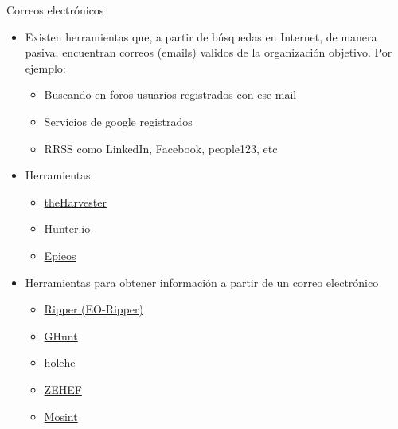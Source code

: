 \documentclass[aspectratio=169,11pt]{beamer}
\begin{document}
\begin{frame}[allowframebreaks]{Correos electrónicos}
\small
  \begin{itemize}
  \item Existen herramientas que, a partir de búsquedas en Internet, de manera pasiva, encuentran correos (emails) validos de la organización objetivo. Por ejemplo:
  \begin{itemize}

  \item Buscando en foros usuarios registrados con ese mail
  \item Servicios de google registrados
  \item RRSS como LinkedIn, Facebook, people123, etc

  \end{itemize}
  \item Herramientas:
  \begin{itemize}

  \item \href{https://github.com/laramies/theHarvester}{theHarvester}
  \item \href{https://hunter.io/}{Hunter.io}
  \item \href{https://epieos.com/}{Epieos}
    \end{itemize}
  \item Herramientas para obtener información a partir de un correo electrónico
    \begin{itemize}

  \item \href{https://github.com/Quantika14/email-osint-ripper}{Ripper (EO-Ripper)}
  \item \href{https://github.com/mxrch/GHunt}{GHunt}
  \item \href{https://github.com/megadose/holehe}{holehe}
  \item \href{https://www.linkedin.com/posts/vicentegarrigues-trenor_osint-cybersecurity-emailosint-ugcPost-7336529048434606080-MccL/}{ZEHEF}
  \item \href{https://www.linkedin.com/posts/carlos-bartels-66a60763_osint-cybersecurity-threatintelligence-activity-7298811240082989057-o7pd/}{Mosint}
  \end{itemize}
  \end{itemize}
\end{frame}
\end{document}
